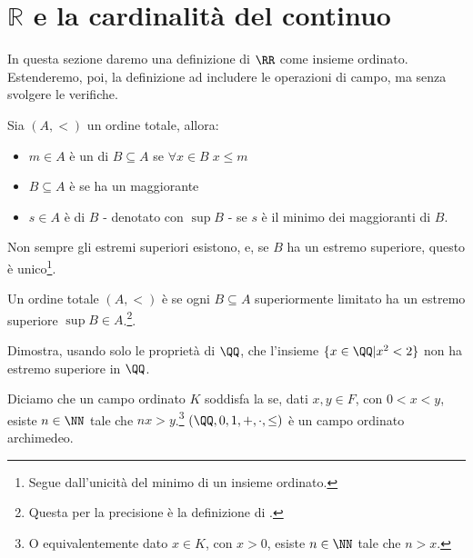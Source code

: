 \section{\texorpdfstring{$\mathbb{R}$ e la cardinalità del continuo}{R e la cardinalità del continuo}}

In questa sezione daremo una definizione di $\RR$ come insieme ordinato. Estenderemo, poi, la definizione ad includere le operazioni di campo, ma senza svolgere le verifiche.

\begin{definition}
	Sia $(A,<)$ un ordine totale, allora:
	\begin{itemize}
		\item $m \in A$ è un  di $B \subseteq A$ se $\forall x \in B \; x \leq m$
		\item $B \subseteq A$ è  se ha un maggiorante
		\item $s\in A$ è  di $B$ - denotato con $\sup B$ - se $s$ è il minimo dei maggioranti di $B$.
	\end{itemize}
\end{definition}

\begin{note}
	Non sempre gli estremi superiori esistono, e, se $B$ ha un estremo superiore, questo è unico\footnote{Segue dall'unicità del minimo di un insieme ordinato.}.
\end{note}

\begin{definition}
	Un ordine totale $(A,<)$ è  se ogni $B \subseteq A$ superiormente limitato ha un estremo superiore $\sup B \in A$.\footnote{Questa per la precisione è la definizione di .}.
\end{definition}

\begin{exercise}
	\label{q_noncompleto}
	Dimostra, usando solo le proprietà di $\QQ$, che l'insieme $\{x \in \QQ | x^2 < 2\}$ non ha estremo superiore in $\QQ$.
\end{exercise}

\begin{lemma}[$\QQ$ è archimedeo]
	Diciamo che un campo ordinato $K$ soddisfa la  se, dati $x,y \in F$, con $0 < x < y$, esiste $n \in \NN$ tale che $nx > y$.\footnote{O equivalentemente dato $x \in K$, con $x > 0$, esiste $n \in \NN$ tale che $n > x$.}
	$(\QQ,0,1,+,\cdot,\leq)$ è un campo ordinato archimedeo.
\end{lemma}

